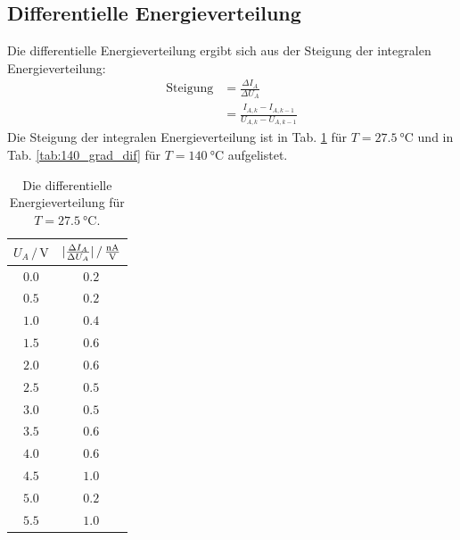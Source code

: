 \FloatBarrier
\subsection{Differentielle Energieverteilung}
Die differentielle Energieverteilung ergibt sich aus der Steigung der integralen Energieverteilung:
\begin{align*}
    \text{Steigung} &= \frac{\Delta I_A}{\Delta U_A} \\
    &= \frac{I_{A,k} - I_{A,k-1}}{U_{A,k} - U_{A,k-1}}
\end{align*}
Die Steigung der integralen Energieverteilung ist in Tab. \ref{tab:raumtemperatur_dif} für $T=\SI{27.5}{\degreeCelsius}$ und in Tab. \ref{tab:140_grad_dif} für $T=\SI{140}{\degreeCelsius}$ aufgelistet.
\begin{table}
    \centering
    \begin{tabular}{cc}
        \toprule
        $U_A \,/\, \si{\volt}$ & $|\frac{\Delta I_A}{\Delta U_A}| \,/\, \si{\frac{\nano\ampere}{\volt}}$ \\
        \midrule
        $0.0$ & $0.2$\\
        $0.5$ & $0.2$\\
        $1.0$ & $0.4$\\
        $1.5$ & $0.6$\\
        $2.0$ & $0.6$\\
        $2.5$ & $0.5$\\
        $3.0$ & $0.5$\\
        $3.5$ & $0.6$\\
        $4.0$ & $0.6$\\
        $4.5$ & $1.0$\\
        $5.0$ & $0.2$\\
        $5.5$ & $1.0$\\
        \bottomrule
    \end{tabular}
    \caption{Die differentielle Energieverteilung für $T=\SI{27.5}{\degreeCelsius}$.}
    \label{tab:raumtemperatur_dif}
\end{table}

